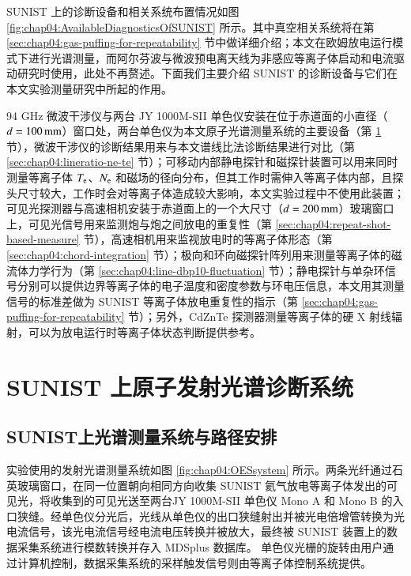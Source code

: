 SUNIST 上的诊断设备和相关系统布置情况如图 \ref{fig:chap04:AvailableDiagnosticsOfSUNIST} 所示。其中真空相关系统将在第 \ref{sec:chap04:gas-puffing-for-repeatability} 节中做详细介绍；本文在欧姆放电运行模式下进行光谱测量，而阿尔芬波与微波预电离天线为非感应等离子体启动和电流驱动研究时使用\cite{TanYi:HJBYDLZTWL:ECW,TanYi2008:Thesis,TanYi2011:NF:ECR}，此处不再赘述。下面我们主要介绍 SUNIST 的诊断设备与它们在本文实验测量研究中所起的作用。

94 GHz 微波干涉仪与两台 JY 1000M-SII\cite{JY1000M} 单色仪安装在位于赤道面的小直径（$d=100\,{\rm mm}$）窗口处，两台单色仪为本文原子光谱测量系统的主要设备（第 \ref{sec:chap04:spectroscopy-system} 节），微波干涉仪的诊断结果用来与本文谱线比法诊断结果进行对比（第 \ref{sec:chap04:lineratio-ne-te} 节）；可移动内部静电探针和磁探针装置可以用来同时测量等离子体 $T_{\rm e}$、$N_{\rm e}$ 和磁场的径向分布，但其工作时需伸入等离子体内部，且探头尺寸较大，工作时会对等离子体造成较大影响，本文实验过程中不使用此装置；可见光探测器与高速相机安装于赤道面上的一个大尺寸（$d=200\,{\rm mm}$）玻璃窗口上，可见光信号用来监测炮与炮之间放电的重复性（第 \ref{sec:chap04:repeat-shot-based-measure} 节），高速相机用来监视放电时的等离子体形态（第 \ref{sec:chap04:chord-integration} 节）；极向和环向磁探针阵列用来测量等离子体的磁流体力学行为（第 \ref{sec:chap04:line-dbp10-fluctuation} 节）；静电探针与单杂环信号分别可以提供边界等离子体的电子温度和密度参数与环电压信息，本文用其测量信号的标准差做为 SUNIST 等离子体放电重复性的指示（第 \ref{sec:chap04:gas-puffing-for-repeatability} 节）；另外，CdZnTe 探测器测量等离子体的硬 X 射线辐射，可以为放电运行时等离子体状态判断提供参考。

\section{SUNIST 上原子发射光谱诊断系统}
\label{sec:chap04:spectroscopy-system}

\subsection{SUNIST上光谱测量系统与路径安排}

实验使用的发射光谱测量系统如图 \ref{fig:chap04:OESsystem} 所示。两条光纤通过石英玻璃窗口，在同一位置朝向相同方向收集 SUNIST 氦气放电等离子体发出的可见光，将收集到的可见光送至两台JY 1000M-SII 单色仪 Mono A 和 Mono B 的入口狭缝。经单色仪分光后，光线从单色仪的出口狭缝射出并被光电倍增管转换为光电流信号，该光电流信号经电流电压转换并被放大，最终被 SUNIST 装置上的数据采集系统进行模数转换并存入 MDSplus\cite{MDSplus:url,MDSplus:paper:1,MDSplus:paper:2} 数据库。
单色仪光栅的旋转由用户通过计算机控制，数据采集系统的采样触发信号则由等离子体控制系统提供。

